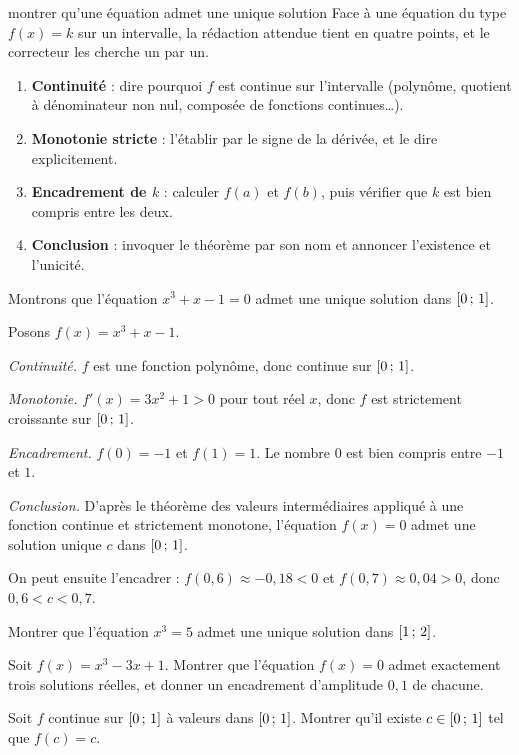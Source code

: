 \begin{methode}{montrer qu'une équation admet une unique solution}
Face à une équation du type $f(x) = k$ sur un intervalle, la rédaction attendue
tient en quatre points, et le correcteur les cherche un par un.

\begin{enumerate}[label=\textbf{\arabic*.}, leftmargin=*, itemsep=0.3em]
  \item \textbf{Continuité} : dire pourquoi $f$ est continue sur l'intervalle
        (polynôme, quotient à dénominateur non nul, composée de fonctions
        continues\ldots).
  \item \textbf{Monotonie stricte} : l'établir par le signe de la dérivée,
        et le dire explicitement.
  \item \textbf{Encadrement de $k$} : calculer $f(a)$ et $f(b)$, puis vérifier
        que $k$ est bien compris entre les deux.
  \item \textbf{Conclusion} : invoquer le théorème par son nom et annoncer
        l'existence et l'unicité.
\end{enumerate}
\end{methode}

\begin{exemple}
Montrons que l'équation $x^{3} + x - 1 = 0$ admet une unique solution dans
$\left[0\,;\,1\right]$.

Posons $f(x) = x^{3} + x - 1$.

\smallskip
\emph{Continuité.} $f$ est une fonction polynôme, donc continue sur
$\left[0\,;\,1\right]$.

\smallskip
\emph{Monotonie.} $f'(x) = 3x^{2} + 1 > 0$ pour tout réel $x$, donc $f$ est
strictement croissante sur $\left[0\,;\,1\right]$.

\smallskip
\emph{Encadrement.} $f(0) = -1$ et $f(1) = 1$. Le nombre $0$ est bien compris
entre $-1$ et $1$.

\smallskip
\emph{Conclusion.} D'après le théorème des valeurs intermédiaires appliqué à
une fonction continue et strictement monotone, l'équation $f(x) = 0$ admet une
solution unique $c$ dans $\left[0\,;\,1\right]$.

\smallskip
On peut ensuite l'encadrer : $f(0{,}6) \approx -0{,}18 < 0$ et
$f(0{,}7) \approx 0{,}04 > 0$, donc $0{,}6 < c < 0{,}7$.
\end{exemple}

\begin{entrainement}
\exo[\niveau{1}] Montrer que l'équation $x^{3} = 5$ admet une unique solution
dans $\left[1\,;\,2\right]$.

\exo[\niveau{2}] Soit $f(x) = x^{3} - 3x + 1$. Montrer que l'équation
$f(x) = 0$ admet exactement trois solutions réelles, et donner un encadrement
d'amplitude $0{,}1$ de chacune.

\exo[\niveau{3}] Soit $f$ continue sur $\left[0\,;\,1\right]$ à valeurs dans
$\left[0\,;\,1\right]$. Montrer qu'il existe $c \in \left[0\,;\,1\right]$ tel que
$f(c) = c$.
\end{entrainement}

